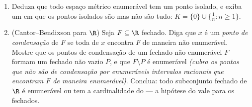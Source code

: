 \begin{problem}
\begin{enumerate}[resume]
  \item Deduza que todo espaço métrico  enumerável tem um ponto
        isolado, e exiba um em que os pontos isolados são  mas
        não são tudo: $K = \{0\} \cup
        \{\frac1n : n \geq 1\}$.
  \item (Cantor--Bendixson para $\R$) Seja $F \subseteq \R$ fechado. Diga que
        $x$ é um \emph{ponto de condensação} de $F$ se toda
         de $x$ encontra $F$ de maneira não enumerável.
        Mostre que os pontos de condensação de um fechado não
        enumerável $F$ formam um fechado  não vazio $P$,
        e que $F
        \setminus P$ é enumerável \emph{(cubra os pontos que não são de
        condensação por enumeráveis intervalos racionais que encontram
        $F$ de maneira enumerável)}. Conclua: todo subconjunto
        fechado de $\R$ é enumerável ou tem a cardinalidade do
         --- a hipótese do  vale para os fechados.
\end{enumerate}


\end{problem}

